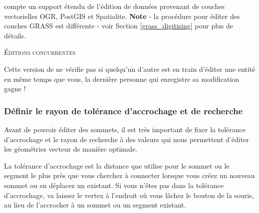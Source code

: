 \qg compte un support étendu de l'édition de données provenant de couches vectorielles OGR, PostGIS et Spatialite. \textbf{Note} - la procédure pour éditer des couches GRASS est différente - voir Section \ref{grass_digitising} pour plus de détails.

\begin{Tip}[ht]\caption{\textsc{Éditions concurrentes}}
Cette version de \qg ne vérifie pas si quelqu'un d'autre est en train d'éditer une entité en même temps que vous, la dernière personne qui enregistre sa modification gagne !
\end{Tip}

\subsubsection{Définir le rayon de tolérance d'accrochage et de recherche}\label{snapping_tolerance}

Avant de pouvoir éditer des sommets, il est très important de fixer la tolérance d'accrochage et le rayon de recherche à des valeurs qui nous permettent d'éditer les géométries vecteur de manière optimale.


La tolérance d'accrochage est la distance que \qg utilise pour  le sommet ou le segment le plus près que vous cherchez à connecter lorsque vous créez un nouveau sommet ou en déplacez un existant. Si vous n'êtes pas dans la tolérance d'accrochage, \qg va laisser le vertex à l'endroit où vous lâchez le bouton de la souris, au lieu de l'accrocher à un sommet ou un segment existant.

